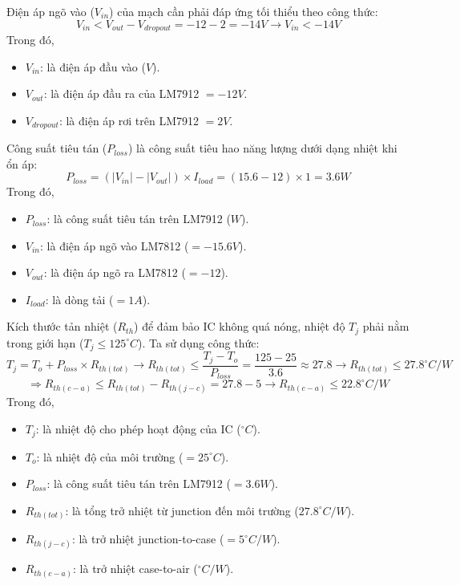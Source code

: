 Điện áp ngõ vào ($V_{in}$) của mạch cần phải đáp ứng tối thiểu theo công thức: \[ V_{in} < V_{out} - V_{dropout} = -12 - 2 = -14V \rightarrow V_{in} < -14V\]
Trong đó,
\begin{itemize}[label = -]
	\item $V_{in}$: là điện áp đầu vào ($V$).
	\item $V_{out}$: là điện áp đầu ra của LM7912 $=-12V$.
	\item $V_{dropout}$: là điện áp rơi trên LM7912 $=2V$.
\end{itemize}

Công suất tiêu tán ($P_{loss}$) là công suất tiêu hao năng lượng dưới dạng nhiệt khi ổn áp: \[ P_{loss} = (|V_{in}| - |V_{out}|) \times I_{load} = (15.6 - 12)\times 1 = 3.6W\]
Trong đó,
\begin{itemize}[label=-]
	\item $P_{loss}$: là công suất tiêu tán trên LM7912 ($W$).
	\item $V_{in}$: là điện áp ngõ vào LM7812 ($=-15.6V$).
	\item $V_{out}$: là điện áp ngõ ra LM7812 ($=-12$).
	\item $I_{load}$: là dòng tải ($=1A$).
\end{itemize}

Kích thước tản nhiệt ($R_{th}$) để đảm bảo IC không quá nóng, nhiệt độ $T_j$ phải nằm trong giới hạn ($T_j \leq 125^{\circ}C$). Ta sử dụng công thức: \[ T_{j} = T_{o} + P_{loss} \times R_{th(tot)} \rightarrow R_{th(tot)} \leq \dfrac{T_{j} - T_{o}}{P_{loss}} = \dfrac{125 - 25}{3.6} \approx 27.8 \rightarrow R_{th(tot)} \leq 27.8^{\circ}C/W
\]
\[ \Rightarrow R_{th(c-a)} \leq R_{th(tot)} - R_{th(j-c)} = 27.8 - 5 \rightarrow R_{th(c-a)} \leq 22.8^{\circ}C/W \]
Trong đó,
\begin{itemize}[label = -]
	\item $T_{j}$: là nhiệt độ cho phép hoạt động của IC ($ ^\circ C$).
	\item $T_{o}$: là nhiệt độ của môi trường ($=25^{\circ}C$).
	\item $P_{loss}$: là công suất tiêu tán trên LM7912 ($=3.6W$).
	\item $R_{th(tot)}$: là tổng trở nhiệt từ junction đến môi trường ($27.8^{\circ}C/W$).
	\item $R_{th(j-c)}$: là trở nhiệt junction-to-case ($=5^{\circ}C/W$).
	\item $R_{th(c-a)}$: là trở nhiệt case-to-air ($^{\circ}C/W$).
\end{itemize}


